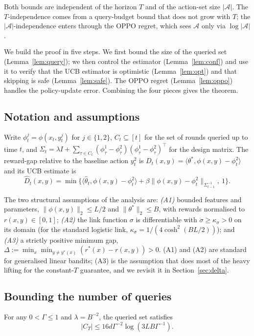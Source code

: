 \documentclass[11pt]{article}
\begin{document}
Both bounds are independent of the horizon $T$ and of the action-set size $|\mathcal{A}|$. The $T$-independence comes from a query-budget bound that does not grow with $T$; the $|\mathcal{A}|$-independence enters through the OPPO regret, which sees $\mathcal{A}$ only via $\log|\mathcal{A}|$.

We build the proof in five steps. We first bound the size of the queried set (Lemma~\ref{lem:query}); we then control the estimator (Lemma~\ref{lem:conf}) and use it to verify that the UCB estimator is optimistic (Lemma~\ref{lem:opt}) and that skipping is safe (Lemma~\ref{lem:safe}). The OPPO regret (Lemma~\ref{lem:oppo}) handles the policy-update error. Combining the four pieces gives the theorem.

\subsection{Notation and assumptions}

Write $\phi_t^j = \phi(x_t, y_t^j)$ for $j \in \{1, 2\}$, $C_t \subseteq [t]$ for the set of rounds queried up to time $t$, and $\Sigma_t = \lambda I + \sum_{\tau \in C_t} (\phi_\tau^1 - \phi_\tau^2)(\phi_\tau^1 - \phi_\tau^2)^\top$ for the design matrix. The reward-gap relative to the baseline action $y_t^2$ is $D_t(x, y) = \langle \theta^*, \phi(x, y) - \phi_t^2 \rangle$ and its UCB estimate is
\[
  \hat D_t(x, y) = \min\!\bigl\{ \langle \hat\theta_t, \phi(x, y) - \phi_t^2 \rangle + \beta \|\phi(x, y) - \phi_t^2\|_{\Sigma_{t-1}^{-1}},\ 1 \bigr\}.
\]

The two structural assumptions of the analysis are: \emph{(A1)} bounded features and parameters, $\|\phi(x, y)\|_2 \le L/2$ and $\|\theta^*\|_2 \le B$, with rewards normalised to $r(x, y) \in [0, 1]$; \emph{(A2)} the link function $\sigma$ is differentiable with $\dot\sigma \ge \kappa_\sigma > 0$ on its domain (for the standard logistic link, $\kappa_\sigma = 1/(4 \cosh^2(B L /2))$); and \emph{(A3)} a strictly positive minimum gap, $\Delta := \min_x \min_{y \neq y^*(x)} (r^*(x) - r(x, y)) > 0$. (A1) and (A2) are standard for generalised linear bandits; (A3) is the assumption that does most of the heavy lifting for the constant-$T$ guarantee, and we revisit it in Section~\ref{sec:delta}.

\subsection{Bounding the number of queries}

\begin{lemma}
\label{lem:query}
For any $0 < \Gamma \le 1$ and $\lambda = B^{-2}$, the queried set satisfies
\[
  |C_T| \le 16 d \Gamma^{-2} \log(3 L B \Gamma^{-1}).
\]
\end{lemma}
\end{document}
